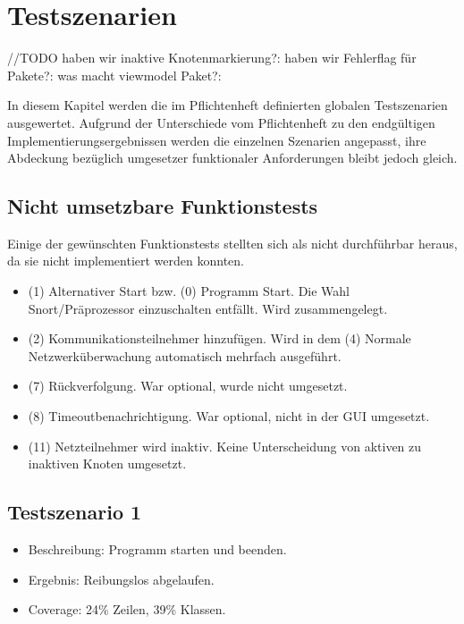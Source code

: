 \chapter{Testszenarien}
//TODO
haben wir inaktive Knotenmarkierung?:
haben wir Fehlerflag für Pakete?:
was macht viewmodel Paket?:




In diesem Kapitel werden die im Pflichtenheft definierten globalen Testszenarien ausgewertet. Aufgrund der Unterschiede vom Pflichtenheft zu den endgültigen Implementierungsergebnissen werden die einzelnen Szenarien angepasst, ihre Abdeckung bezüglich umgesetzer funktionaler Anforderungen bleibt jedoch gleich.

\section{Nicht umsetzbare Funktionstests}

Einige der gewünschten Funktionstests stellten sich als nicht durchführbar heraus, da sie nicht implementiert werden konnten.

\begin{itemize}
  \item (1)  Alternativer Start bzw. (0) Programm Start. Die Wahl Snort/Präprozessor einzuschalten entfällt. Wird zusammengelegt.
  \item (2)  Kommunikationsteilnehmer hinzufügen. Wird in dem (4) Normale Netzwerküberwachung automatisch mehrfach ausgeführt.
  \item (7)  Rückverfolgung. War optional, wurde nicht umgesetzt.
  \item (8)  Timeoutbenachrichtigung. War optional, nicht in der GUI umgesetzt.
  \item (11) Netzteilnehmer wird inaktiv. Keine Unterscheidung von aktiven zu inaktiven Knoten umgesetzt.
\end{itemize}

\section{Testszenario 1}

\begin{itemize}
  \item Beschreibung: Programm starten und beenden.
  \item Ergebnis: Reibungslos abgelaufen.
  \item Coverage: 24\% Zeilen, 39\% Klassen.
\end{itemize} 


